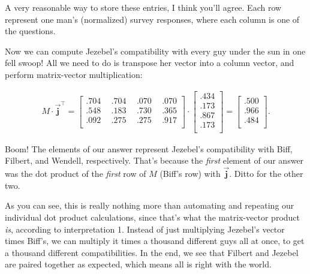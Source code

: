 A very reasonable way to store these entries, I think you'll agree. Each row
represent one man's (normalized) survey responses, where each column is one of
the questions.


Now we can compute Jezebel's compatibility with every guy under the sun in one
fell swoop! All we need to do is transpose her vector into a column vector, and
perform matrix-vector multiplication:

\vspace{-.15in}
\begin{align*}
M \cdot \overrightarrow{\textbf{j}}^\intercal =
\begin{bmatrix}
.704 \ & \ .704 \ & \ .070 \ & \ .070 \\
.548 \ & \ .183 \ & \ .730 \ & \ .365 \\
.092 \ & \ .275 \ & \ .275 \ & \ .917 \\
\end{bmatrix} \cdot 
\begin{bmatrix}
.434 \\ .173 \\ .867 \\ .173 \\
\end{bmatrix} =
\begin{bmatrix}
.500 \\ .966 \\ .484 \\ %
\end{bmatrix}.
\end{align*}
\vspace{-.15in}

Boom! The elements of our answer represent Jezebel's compatibility with Biff,
Filbert, and Wendell, respectively. That's because the \textit{first} element
of our answer was the dot product of the \textit{first} row of $M$ (Biff's row)
with $\overrightarrow{\textbf{j}}$. Ditto for the other two.

As you can see, this is really nothing more than automating and repeating our
individual dot product calculations, since that's what the matrix-vector
product \textit{is}, according to interpretation 1. Instead of just multiplying
Jezebel's vector times Biff's, we can multiply it times a thousand different
guys all at once, to get a thousand different compatibilities. In the end, we
see that Filbert and Jezebel are paired together as expected, which means all
is right with the world.


